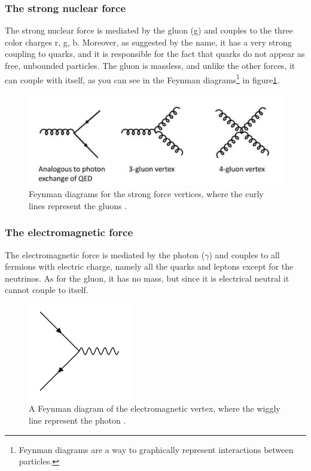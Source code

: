 \subsubsection{The strong nuclear force}
The strong nuclear force is mediated by the gluon (g) \cite{thomson} and couples to the three color charges r, g, b. Moreover, as suggested by the name, it has a very strong coupling to quarks, and it is responsible for the fact that quarks do not appear as free, unbounded particles. The gluon is massless, and unlike the other forces, it can couple with itself, as you can see in the Feynman diagrams\footnote{Feynman diagrams are a way to graphically represent interactions between particles.} in figure\ref{fig:gluon_self_int}.

\begin{figure}[H]
    \centering
    \includegraphics[width = \textwidth]{Figures/FeynmanDiagrams/gluon.pdf}
    \caption{Feynman diagrams for the strong force vertices, where the curly lines represent the gluons \cite{STRONGforce}.}
    \label{fig:gluon_self_int}
\end{figure}

\subsubsection{The electromagnetic force}
The electromagnetic force is mediated by the photon ($\gamma$) \cite{thomson} and couples to all fermions with electric charge, namely all the quarks and leptons except for the neutrinos. As for the gluon, it has no mass, but since it is electrical neutral it cannot couple to itself. 

\begin{figure}[H]
    \centering
    \includegraphics[width = 0.4\textwidth]{Figures/FeynmanDiagrams/photon.png}
    \caption{A Feynman diagram of the electromagnetic vertex, where the wiggly line represent the photon \cite{EMforce}.}
    \label{fig:my_label}
\end{figure}

